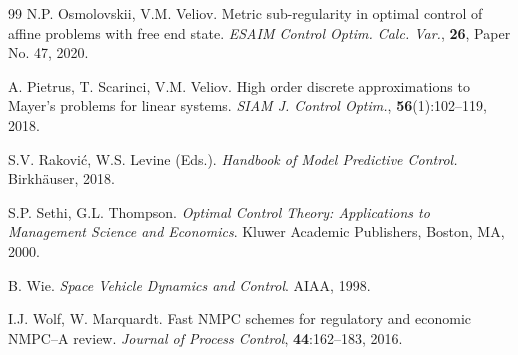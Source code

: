 \documentclass[11pt]{article}
\begin{document}
\begin{thebibliography}{99}
N.P. Osmolovskii, V.M. Veliov. Metric sub-regularity in optimal control of
affine problems with free end state. {\em ESAIM Control Optim. Calc. Var.}, {\bf 26}, Paper No. 47, 2020.

A. Pietrus, T. Scarinci, V.M. Veliov.
High order discrete approximations to Mayer's problems for linear systems. 
{\em SIAM J. Control Optim.}, {\bf 56}(1):102--119, 2018.

S.V. Rakovi\'c, W.S. Levine (Eds.). {\em Handbook of Model Predictive Control.} 
Birkh\"auser, 2018.

S.P. Sethi, G.L. Thompson.
{\em Optimal Control Theory: Applications to Management Science and Economics}.
Kluwer Academic Publishers, Boston, MA, 2000.

B. Wie. {\em Space Vehicle Dynamics and Control}. AIAA, 1998.

I.J. Wolf, W. Marquardt. Fast NMPC schemes for regulatory and economic NMPC--A review.
{\em Journal of Process Control}, {\bf 44}:162--183, 2016.

\end{thebibliography}
\end{document}
